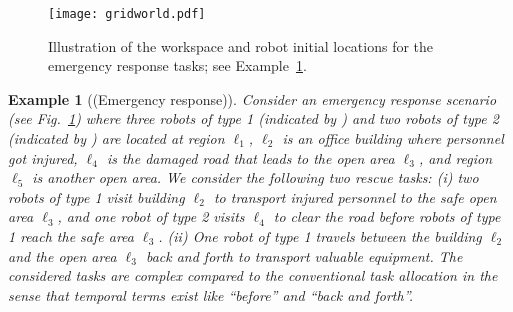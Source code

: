 \documentclass[Afour,sageh,times]{sagej}
\newtheorem{exmp}{Example}
\newlength\myheight
\newlength\mydepth
\newcommand*\inlinegraphics[1]{%
  \settototalheight\myheight{Xygp}%
  \settodepth\mydepth{Xygp}%
  \raisebox{-0.7\mydepth}{\texttt{[image: \#1]}}%
}
\begin{document}
 \begin{figure}[!t]
    \centering
    \texttt{[image: gridworld.pdf]}
    \caption{Illustration of the workspace and robot initial locations for the emergency response tasks; see Example~\ref{exmp:1}.}\label{fig:workspace}
\end{figure}
\begin{exmp}[(Emergency response)]\label{exmp:1}
 Consider an emergency response scenario (see Fig.~\ref{fig:workspace}) where three robots of type 1 (indicated by \inlinegraphics{star.pdf}) and two robots of type 2 (indicated by \inlinegraphics{bluedot.pdf}) are located at region $\ell_1$, $\ell_2$ is an office building where personnel got injured, $\ell_4$ is the damaged road that leads to the open area $\ell_3$, and region $\ell_5$ is another open area. We consider the following two rescue tasks: {\it (i)} \label{task:i} two robots of type 1 visit building $\ell_2$ to transport injured personnel to the safe open area $\ell_3$, and one robot of type 2 visits $\ell_4$ to clear the road before robots of type 1 reach the safe area $\ell_3$. {\it (ii)} \label{task:ii} One robot of type 1 travels between the building $\ell_2$ and the open area $\ell_3$ back and forth to transport valuable equipment. The considered tasks are complex compared to the conventional task allocation in the sense that temporal terms exist like ``before'' and ``back and forth''.

\end{exmp}
\end{document}
